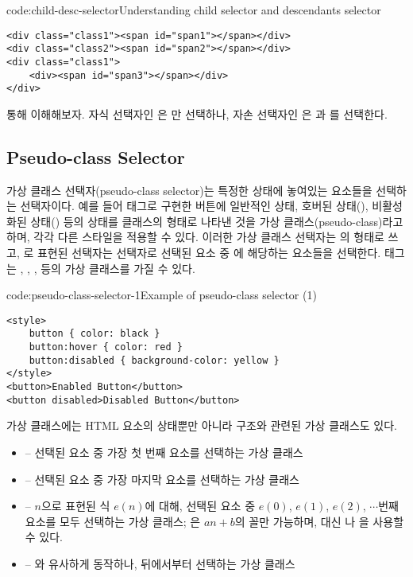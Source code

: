 \begin{code}{code:child-desc-selector}{Understanding child selector and descendants selector}
\begin{verbatim}
<div class="class1"><span id="span1"></span></div>
<div class="class2"><span id="span2"></span></div>
<div class="class1">
    <div><span id="span3"></span></div>
</div>
\end{verbatim}
\end{code}
\clearpage

\를 통해 이해해보자. 자식 선택자인 은 만 선택하나, 자손 선택자인 은 과 를 선택한다.

\subsection*{Pseudo-class Selector}

가상 클래스 선택자(pseudo-class selector)는 특정한 상태에 놓여있는 요소들을 선택하는 선택자이다. 예를 들어  태그로 구현한 버튼에 일반적인 상태, 호버된 상태(), 비활성화된 상태() 등의 상태를 클래스의 형태로 나타낸 것을 가상 클래스(pseudo-class)라고 하며, 각각 다른 스타일을 적용할 수 있다. 이러한 가상 클래스 선택자는 의 형태로 쓰고, 로 표현된 선택자는  선택자로 선택된 요소 중 에 해당하는 요소들을 선택한다.  태그는 , , ,  등의 가상 클래스를 가질 수 있다.

\begin{code}{code:pseudo-class-selector-1}{Example of pseudo-class selector (1)}
\begin{verbatim}
<style>
    button { color: black }
    button:hover { color: red }
    button:disabled { background-color: yellow }
</style>
<button>Enabled Button</button>
<button disabled>Disabled Button</button>
\end{verbatim}
\end{code}

가상 클래스에는 HTML 요소의 상태뿐만 아니라 구조와 관련된 가상 클래스도 있다.

\begin{itemize}
    \item {} – 선택된 요소 중 가장 첫 번째 요소를 선택하는 가상 클래스
    \item {} – 선택된 요소 중 가장 마지막 요소를 선택하는 가상 클래스
    \item {} – $n$으로 표현된 식 $e(n)$에 대해, 선택된 요소 중 $e(0)$, $e(1)$, $e(2)$, $\cdots$번째 요소를 모두 선택하는 가상 클래스; 은 $an+b$의 꼴만 가능하며,  대신 나 을 사용할 수 있다.
    \item {} – 와 유사하게 동작하나, 뒤에서부터 선택하는 가상 클래스
\end{itemize}

